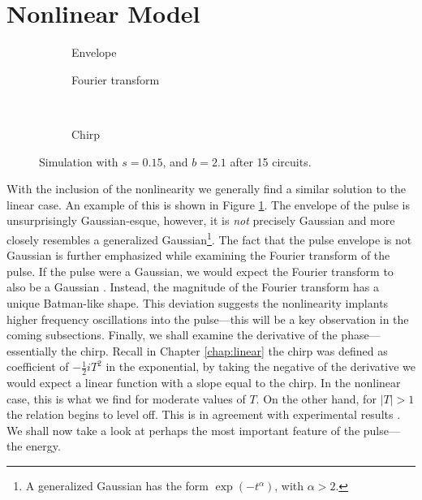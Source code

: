 \section{Nonlinear Model}
\begin{figure}[tbp]
\centering
\begin{subfigure}{0.5\textwidth}
\centering

\caption{Envelope}
\end{subfigure}%
\begin{subfigure}{0.5\textwidth}
\centering

\caption{Fourier transform}
\end{subfigure} \\
\begin{subfigure}{0.5\textwidth}
\centering

\caption{Chirp}
\end{subfigure}
\caption[Envelope, Fourier transform, and chirp of the pulse---stable case.]{Simulation with $s = 0.15$, and $b = 2.1$ after 15 circuits.}
\label{fig:nlstable}
\end{figure}
With the inclusion of the nonlinearity we generally find a similar solution to the linear case. An example of this is shown in Figure \ref{fig:nlstable}. The envelope of the pulse is unsurprisingly Gaussian-esque, however, it is \emph{not} precisely Gaussian and more closely resembles a generalized Gaussian\footnote{A generalized Gaussian has the form $\exp \left(-t^\alpha \right)$, with $\alpha > 2$.}. The fact that the pulse envelope is not Gaussian is further emphasized while examining the Fourier transform of the pulse. If the pulse were a Gaussian, we would expect the Fourier transform to also be a Gaussian \cite{debnath, gradshteyn}. Instead, the magnitude of the Fourier transform has a unique Batman-like shape. This deviation suggests the nonlinearity implants higher frequency oscillations into the pulse---this will be a key observation in the coming subsections. Finally, we shall examine the derivative of the phase---essentially the chirp. Recall in Chapter \ref{chap:linear} the chirp was defined as coefficient of $-\frac{1}{2}iT^2$ in the exponential, by taking the negative of the derivative we would expect a linear function with a slope equal to the chirp. In the nonlinear case, this is what we find for moderate values of $T$. On the other hand, for $|T| > 1$ the relation begins to level off. This is in agreement with experimental results \cite{chen, rothenberg, tomlinson}. \\

We shall now take a look at perhaps the most important feature of the pulse---the energy. \\

